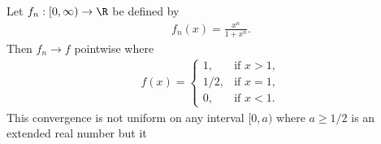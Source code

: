 \documentclass{article}
\begin{document}
\begin{claim*}
   Let $f_n:[0,\infty)\to\R$ be defined by
   \begin{align*}
      f_n(x) = \frac{x^n}{1+x^n}.
   \end{align*}
   Then $f_n\to f$ pointwise where
   \begin{align*}
      f(x) = \begin{cases}
         1,   & \text{if }x > 1, \\
         1/2, & \text{if }x = 1, \\
         0,   & \text{if }x < 1.
      \end{cases}
   \end{align*}
   This convergence is not uniform on any interval $[0, a)$ where
   $a\geq 1/2$ is an extended real number but it
\end{claim*}
\end{document}
